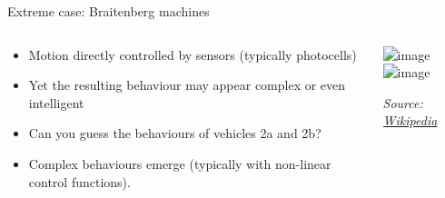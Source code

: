 \documentclass[compress]{beamer}
\newcommand{\source}[2]{{\tiny\it Source: \href{#1}{#2}}}
\begin{document}
\begin{frame}{Extreme case: Braitenberg machines}

    \begin{columns}
        \begin{column}{0.5\linewidth}

            \begin{itemize}
                \item Motion directly controlled by sensors (typically photocells)
                \item Yet the resulting behaviour may appear complex or even intelligent
                \item<1-2> Can you guess the behaviours of vehicles 2a and 2b?
                \item<3-> Complex behaviours emerge (typically with non-linear control functions).
            \end{itemize}

        \end{column}
        \begin{column}{0.5\linewidth}
            \begin{center}
                \includegraphics<1>[width=0.7\linewidth]{Braitenberg_Vehicle_2ab-blind}
                \includegraphics<2->[width=0.7\linewidth]{Braitenberg_Vehicle_2ab}


                \source{https://en.wikipedia.org/wiki/Braitenberg_vehicle}{Wikipedia}
            \end{center}
        \end{column}
    \end{columns}

\end{frame}
\end{document}
